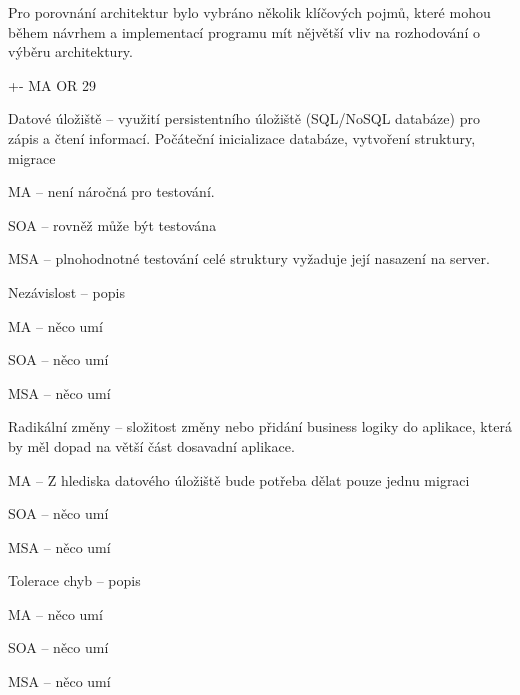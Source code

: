 Pro porovnání architektur bylo vybráno několik klíčových pojmů, které mohou během návrhem a implementací programu mít nějvětší vliv na rozhodování o výběru architektury.

+- MA OR 29


\begin{dl}
   \item[Datové úložiště] – využití persistentního úložiště (SQL/NoSQL databáze) pro zápis a čtení informací.
   Počáteční inicializace databáze, vytvoření struktury, migrace
\end{dl}
\begin{ul}
   \item \gls{MA} – není náročná pro testování.
   \item \gls{SOA} – rovněž může být testována
   \item \gls{MSA} – plnohodnotné testování celé struktury vyžaduje její nasazení na server.
\end{ul}

\begin{dl}
   \item[Nezávislost] – popis
\end{dl}
\begin{ul}
   \item \gls{MA} – něco umí
   \item \gls{SOA} – něco umí
   \item \gls{MSA} – něco umí
\end{ul}

\begin{dl}
   \item[Radikální změny] – složitost změny nebo přidání business logiky do aplikace, která by měl dopad na větší část dosavadní aplikace.
\end{dl}
\begin{ul}
   \item \gls{MA} –
   Z hlediska datového úložiště bude potřeba dělat pouze jednu migraci
   \item \gls{SOA} – něco umí
   \item \gls{MSA} – něco umí
\end{ul}

\begin{dl}
   \item[Tolerace chyb] – popis
\end{dl}
\begin{ul}
   \item \gls{MA} – něco umí
   \item \gls{SOA} – něco umí
   \item \gls{MSA} – něco umí
\end{ul}

